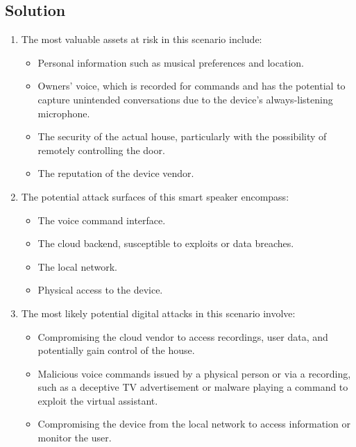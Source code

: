 \subsection*{Solution}
\begin{enumerate}
    \item The most valuable assets at risk in this scenario include:
        \begin{itemize}
            \item Personal information such as musical preferences and location.
            \item Owners' voice, which is recorded for commands and has the potential to capture unintended conversations due to the device's always-listening microphone.
            \item The security of the actual house, particularly with the possibility of remotely controlling the door.
            \item The reputation of the device vendor.
        \end{itemize}
    \item The potential attack surfaces of this smart speaker encompass:
        \begin{itemize}
            \item The voice command interface.
            \item The cloud backend, susceptible to exploits or data breaches.
            \item The local network.
            \item Physical access to the device.
        \end{itemize}
    \item The most likely potential digital attacks in this scenario involve:
        \begin{itemize}
            \item Compromising the cloud vendor to access recordings, user data, and potentially gain control of the house.
            \item Malicious voice commands issued by a physical person or via a recording, such as a deceptive TV advertisement or malware playing a command to exploit the virtual assistant.
            \item Compromising the device from the local network to access information or monitor the user.
        \end{itemize}
\end{enumerate}